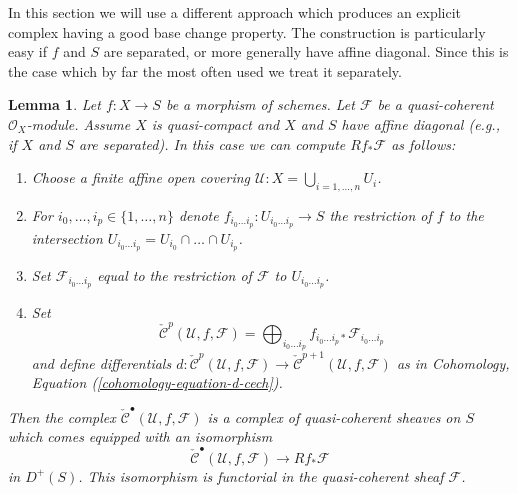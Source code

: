 \documentclass{stacks-project}
\theoremstyle{plain}
\newtheorem{lemma}[subsection]{Lemma}
\theoremstyle{definition}
\theoremstyle{remark}
\numberwithin{equation}{subsection}
\begin{document}
\medskip\noindent
In this section we will use a different approach which produces an
explicit complex having a good base change property. The construction
is particularly easy if $f$ and $S$ are separated, or more generally
have affine diagonal. Since this is the case which
by far the most often used we treat it separately.

\begin{lemma}
\label{lemma-separated-case-relative-cech}
Let $f : X \to S$ be a morphism of schemes.
Let $\mathcal{F}$ be a quasi-coherent $\mathcal{O}_X$-module.
Assume $X$ is quasi-compact and $X$ and $S$ have affine diagonal
(e.g., if $X$ and $S$ are separated).
In this case we can compute $Rf_*\mathcal{F}$ as follows:
\begin{enumerate}
\item Choose a finite affine open covering
$\mathcal{U} : X = \bigcup_{i = 1, \ldots, n} U_i$.
\item For $i_0, \ldots, i_p \in \{1, \ldots, n\}$ denote
$f_{i_0 \ldots i_p} : U_{i_0 \ldots i_p} \to S$ the restriction of $f$
to the intersection $U_{i_0 \ldots i_p} = U_{i_0} \cap \ldots \cap U_{i_p}$.
\item Set $\mathcal{F}_{i_0 \ldots i_p}$ equal to the restriction
of $\mathcal{F}$ to $U_{i_0 \ldots i_p}$.
\item Set
$$
\check{\mathcal{C}}^p(\mathcal{U}, f, \mathcal{F}) =
\bigoplus\nolimits_{i_0 \ldots i_p}
f_{i_0 \ldots i_p *} \mathcal{F}_{i_0 \ldots i_p}
$$
and define differentials
$d : \check{\mathcal{C}}^p(\mathcal{U}, f, \mathcal{F})
\to \check{\mathcal{C}}^{p + 1}(\mathcal{U}, f, \mathcal{F})$
as in Cohomology, Equation (\ref{cohomology-equation-d-cech}).
\end{enumerate}
Then the complex $\check{\mathcal{C}}^\bullet(\mathcal{U}, f, \mathcal{F})$
is a complex of quasi-coherent sheaves on $S$ which comes equipped with an
isomorphism
$$
\check{\mathcal{C}}^\bullet(\mathcal{U}, f, \mathcal{F})
\longrightarrow
Rf_*\mathcal{F}
$$
in $D^{+}(S)$. This isomorphism is functorial in the quasi-coherent
sheaf $\mathcal{F}$.
\end{lemma}
\end{document}
